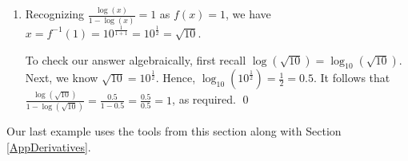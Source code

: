 \documentclass{ximera}
\begin{document}
\begin{ex}
\begin{enumerate}
\begin{center}
\end{center}

\item Recognizing   $\frac{\log(x)}{1-\log(x)} = 1$ as $f(x) = 1$, we have $x = f^{-1}(1) = 10^{\frac{1}{1+1}} = 10^{\frac{1}{2}} = \sqrt{10}$.

To check our answer algebraically,  first recall  $\log(\sqrt{10}) = \log_{10}(\sqrt{10})$.  Next, we know $\sqrt{10} = 10^{\frac{1}{2}}$.  Hence, $\log_{10} \left(10^{\frac{1}{2}} \right) = \frac{1}{2} = 0.5$.  It follows that $\frac{\log(\sqrt{10})}{1-\log(\sqrt{10})} = \frac{0.5}{1-0.5} = \frac{0.5}{0.5} = 1$, as required.  \qed

\end{enumerate}

\end{ex}

\pagebreak

Our last example uses the tools from this section along with Section \ref{AppDerivatives}.
\end{document}
